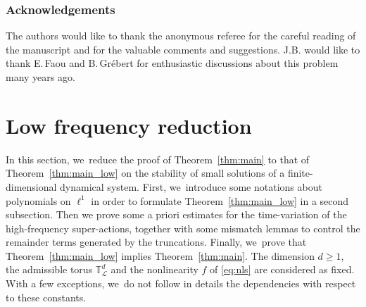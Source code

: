 \documentclass[JEP,XML,SOM,Unicode,published]{cedram}
\theoremstyle{plain}
\theoremstyle{definition}
\newcommand{\1}{\mathbf{1}}
\begin{document}
\subsubsection*{Acknowledgements}
The authors would like to thank the anonymous referee for the careful reading of the manuscript and for the valuable comments and suggestions. J.B. would like to thank E.\,Faou and B.\,Grébert for enthusiastic discussions about this problem many years ago.

\section{Low frequency reduction}
\label{sec:low-freq}
In this section, we~reduce the proof of Theorem~\ref{thm:main} to that of Theorem~\ref{thm:main_low} on the stability of small solutions of a finite-dimensional dynamical system. First, we~introduce some notations about polynomials on $\ell^1$ in order to formulate Theorem~\ref{thm:main_low} in a second subsection. Then we prove some a priori estimates for the time-variation of the high-frequency super-actions, together with some mismatch lemmas to control the remainder terms generated by the truncations. Finally, we~prove that Theorem~\ref{thm:main_low} implies Theorem~\ref{thm:main}. The dimension $d\geq 1$, the admissible torus $\mathbb{T}^d_{\mathscr{L}}$ and the nonlinearity $f$ of \eqref{eq:nls} are considered as fixed. With a few exceptions, we~do not follow in details the dependencies with respect to these constants.
\end{document}

